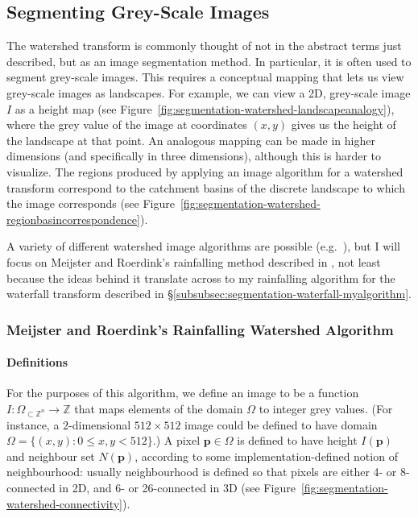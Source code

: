 \subsection{Segmenting Grey-Scale Images}
\label{subsec:segmentation-watershed-greyscale}

The watershed transform is commonly thought of not in the abstract terms just described, but as an image segmentation method. In particular, it is often used to segment grey-scale images. This requires a conceptual mapping that lets us view grey-scale images as landscapes. For example, we can view a 2D, grey-scale image $I$ as a height map (see Figure~\ref{fig:segmentation-watershed-landscapeanalogy}), where the grey value of the image at coordinates $(x,y)$ gives us the height of the landscape at that point. An analogous mapping can be made in higher dimensions (and specifically in three dimensions), although this is harder to visualize. The regions produced by applying an image algorithm for a watershed transform correspond to the catchment basins of the discrete landscape to which the image corresponds (see Figure~\ref{fig:segmentation-watershed-regionbasincorrespondence}).



A variety of different watershed image algorithms are possible (e.g.~\cite{bieniek00,meijster98,osma-ruiz06,rambabu07,stoev00}), but I will focus on Meijster and Roerdink's rainfalling method described in \cite{meijster98}, not least because the ideas behind it translate across to my rainfalling algorithm for the waterfall transform described in \S\ref{subsubsec:segmentation-waterfall-myalgorithm}.

\subsubsection{Meijster and Roerdink's Rainfalling Watershed Algorithm}

\paragraph{Definitions}

For the purposes of this algorithm, we define an image to be a function $I: \Omega_{\subset \mathbb{Z}^n} \to \mathbb{Z}$ that maps elements of the domain $\Omega$ to integer grey values. (For instance, a $2$-dimensional $512 \times 512$ image could be defined to have domain $\Omega = \{(x,y) : 0 \le x,y < 512\}$.) A pixel $\mathbf{p} \in \Omega$ is defined to have height $I(\mathbf{p})$ and neighbour set $N(\mathbf{p})$, according to some implementation-defined notion of neighbourhood: usually neighbourhood is defined so that pixels are either 4- or 8-connected in 2D, and 6- or 26-connected in 3D (see Figure~\ref{fig:segmentation-watershed-connectivity}).

